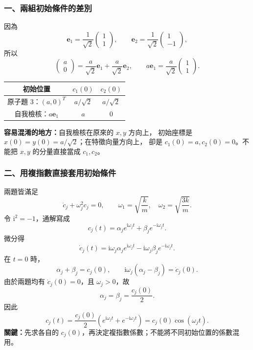 \documentclass[12pt,a4paper]{article}
\begin{document}
\subsubsection*{一、兩組初始條件的差別}
因為
\[
    \mathbf e_1=\frac1{\sqrt2}\begin{pmatrix}1\\1\end{pmatrix},\qquad
    \mathbf e_2=\frac1{\sqrt2}\begin{pmatrix}1\\-1\end{pmatrix},
\]
所以
\[
    \begin{pmatrix}a\\0\end{pmatrix}
    =\frac a{\sqrt2}\mathbf e_1+\frac a{\sqrt2}\mathbf e_2,
    \qquad
    a\mathbf e_1=\frac a{\sqrt2}\begin{pmatrix}1\\1\end{pmatrix}.
\]
\begin{center}
    \renewcommand{\arraystretch}{1.5}
    \begin{tabular}{c|c|c}
        初始位置                  & \(c_1(0)\)   & \(c_2(0)\)   \\
        \hline
        原子題 3：\((a,0)^T\)     & \(a/\sqrt2\) & \(a/\sqrt2\) \\
        自我檢核：\(a\mathbf e_1\) & \(a\)        & \(0\)
    \end{tabular}
\end{center}
\textbf{容易混淆的地方：}自我檢核在原來的 \(x,y\) 方向上，
初始座標是 \(x(0)=y(0)=a/\sqrt2\)；在特徵向量方向上，
卻是 \(c_1(0)=a,c_2(0)=0\)。不能把 \(x,y\) 的分量直接當成 \(c_1,c_2\)。

\subsubsection*{二、用複指數直接套用初始條件}
兩題皆滿足
\[
    \ddot c_j+\omega_j^2c_j=0,\qquad
    \omega_1=\sqrt{\frac{k}{m}},\quad \omega_2=\sqrt{\frac{3k}{m}}.
\]
令 \(\mathrm i^2=-1\)，通解寫成
\[
    c_j(t)=\alpha_j e^{\mathrm i\omega_jt}+\beta_j e^{-\mathrm i\omega_jt}.
\]
微分得
\[
    \dot c_j(t)=\mathrm i\omega_j\alpha_j e^{\mathrm i\omega_jt}
    -\mathrm i\omega_j\beta_j e^{-\mathrm i\omega_jt}.
\]
在 \(t=0\) 時，
\[
    \alpha_j+\beta_j=c_j(0),\qquad
    \mathrm i\omega_j(\alpha_j-\beta_j)=\dot c_j(0).
\]
由於兩題均有 \(\dot c_j(0)=0\)，且 \(\omega_j>0\)，故
\[
    \boxed{\alpha_j=\beta_j=\frac{c_j(0)}2}.
\]
因此
\[
    c_j(t)=\frac{c_j(0)}2
    \left(e^{\mathrm i\omega_jt}+e^{-\mathrm i\omega_jt}\right)
    =c_j(0)\cos(\omega_jt).
\]
\textbf{關鍵：}先求各自的 \(c_j(0)\)，再決定複指數係數；不能將不同初始位置的係數混用。
\end{document}
